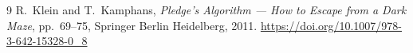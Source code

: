 \documentclass[12pt, a4paper]{report}
\begin{document}



\tableofcontents
\newpage





\begin{thebibliography}{9}
R.~Klein and T.~Kamphans,
\textit{Pledge's Algorithm --- How to Escape from a Dark Maze},
pp.~69--75, Springer Berlin Heidelberg, 2011.
\url{https://doi.org/10.1007/978-3-642-15328-0\_8}
\end{thebibliography}

\end{document}
